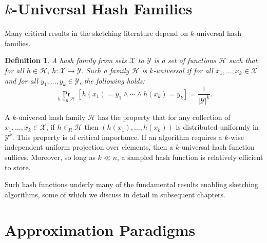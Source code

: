 \documentclass{report}
\newtheorem{definition}{Definition}[section]
\begin{document}
\section{$k$-Universal Hash Families} \label{sec:hashing}

Many critical results in the sketching literature depend on $k$-universal hash families. 
%
\begin{definition}
A hash family from sets $\mathcal{X}$ to $\mathcal{Y}$ is a set of functions $\mathcal{H}$ such that for all $h \in \mathcal{H}$, $h: \mathcal{X} \rightarrow \mathcal{Y}$.
Such a family $\mathcal{H}$ is $k$-universal if for all $x_1, \dots, x_k \in \mathcal{X}$ and for all $y_1, \dots, y_k \in \mathcal{Y}$, the following holds:
\begin{equation*}
\Pr_{h \in_R \mathcal{H}} \left [ h(x_1) = y_1 \wedge \cdots \wedge h(x_k) = y_k \right ] = \frac{1}{|\mathcal{Y}|^k}.
\end{equation*}
\end{definition}
%
A $k$-universal hash family $\mathcal{H}$ has the property that for any collection of $x_1, \dots, x_k \in \mathcal{X}$, if $h \in_R \mathcal{H}$ then $(h(x_1), \dots, h(x_k))$ is distributed uniformly in $\mathcal{Y}^k$. 
This property is of critical importance.
If an algorithm requires a $k$-wise independent uniform projection over elements, then a $k$-universal hash function suffices.
Moreover, so long as $k \ll n$, a sampled hash function is relatively efficient to store. 

Such hash functions underly many of the fundamental results enabling sketching algorithms, some of which we discuss in detail in subsequent chapters.


















\section{Approximation Paradigms} \label{sec:approx}
\end{document}
